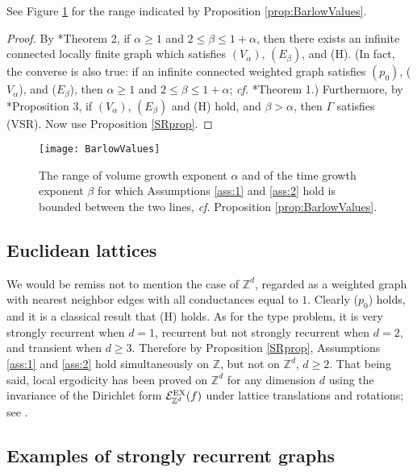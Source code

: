 \documentclass[11pt]{amsart}
\theoremstyle{plain}
\theoremstyle{definition}
\theoremstyle{remark}
\begin{document}
See Figure \ref{fig:BarlowValues} for the range indicated by Proposition \ref{prop:BarlowValues}.

\begin{proof}
By \cite{BarlowValues}*{Theorem 2}, if $\alpha\geq 1$ and $2\leq \beta \leq 1+\alpha$, then there exists an infinite connected locally finite graph which satisfies $(V_\alpha)$, $(E_\beta)$, and (H). (In fact, the converse is also true: if an infinite connected weighted graph satisfies $(p_0)$, ($V_\alpha$), and ($E_\beta$), then $\alpha\geq 1$ and $2\leq \beta \leq 1+\alpha$; \emph{cf.\@} \cite{BarlowValues}*{Theorem 1}.) Furthermore, by \cite{BarlowValues}*{Proposition 3}, if $(V_\alpha)$, $(E_\beta)$ and (H) hold, and $\beta>\alpha$, then $\Gamma$ satisfies (VSR). Now use Proposition \ref{SRprop}.
\end{proof}

\begin{figure}
\centering
\texttt{[image: BarlowValues]}
\caption{The range of volume growth exponent $\alpha$ and of the time growth exponent $\beta$ for which Assumptions \ref{ass:1} and \ref{ass:2} hold is bounded between the two lines, \emph{cf.\@} Proposition \ref{prop:BarlowValues}.}
\label{fig:BarlowValues}
\end{figure}

\subsection{Euclidean lattices}

We would be remiss not to mention the case of $\mathbb{Z}^d$, regarded as a weighted graph with nearest neighbor edges with all conductances equal to $1$. Clearly ($p_0$) holds, and it is a classical result that (H) holds. As for the type problem, it is very strongly recurrent when $d=1$, recurrent but not strongly recurrent when $d=2$, and transient when $d\geq 3$. Therefore by Proposition \ref{SRprop}, Assumptions \ref{ass:1} and \ref{ass:2} hold simultaneously on $\mathbb{Z}$, but not on $\mathbb{Z}^d$, $d\geq 2$. That being said, local ergodicity has been proved on $\mathbb{Z}^d$ for any dimension $d$ using the invariance of the Dirichlet form $\mathcal{E}^{\rm EX}_{\mathbb{Z}^d}(f)$ under lattice translations and rotations; see \cites{GPV88, KOV89,KipnisLandim}.


\subsection{Examples of strongly recurrent graphs}
\end{document}
